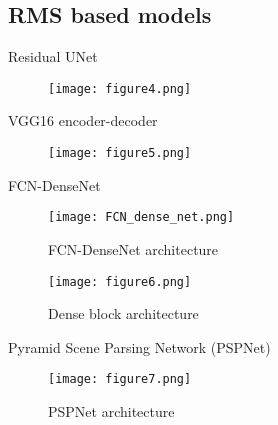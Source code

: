 \documentclass[10pt,aspectratio=169,dvipsnames]{beamer} %
\newcounter{angle}
\begin{document}
\setcounter{subfigure}{0}
\subsection{RMS based models}
\begin{frame}{Residual UNet}
	\begin{figure}
		\centering
		\texttt{[image: figure4.png]}
	\end{figure}
\end{frame}

\begin{frame}{VGG16 encoder-decoder}
	\begin{figure}
		\centering
		\texttt{[image: figure5.png]}
	\end{figure}
\end{frame}
\begin{frame}{FCN-DenseNet}
	\begin{minipage}[c]{0.48\textwidth}
		\begin{figure} [h!]
			\texttt{[image: FCN\_dense\_net.png]}
			\caption{FCN-DenseNet architecture} 
			\label{fcn}
		\end{figure}
	\end{minipage}
	\hfill
	\begin{minipage}[c]{0.48\textwidth}
		\begin{figure} [h!]
			\centering
			\texttt{[image: figure6.png]}
			\caption{Dense block architecture} 
		\end{figure}
	\end{minipage}
\end{frame}
\begin{frame}{Pyramid Scene Parsing Network (PSPNet)}
	\begin{figure} [h!]
		\centering
		\texttt{[image: figure7.png]}
		\caption{PSPNet architecture} 
	\end{figure}
\end{frame}
\end{document}
